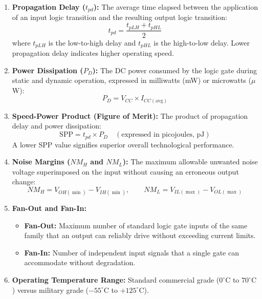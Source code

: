 \documentclass[11pt,a4paper,oneside]{book}
\begin{document}
\begin{enumerate}[leftmargin=*]
  \item \textbf{Propagation Delay ($t_{pd}$):} The average time elapsed between the application of an input logic transition and the resulting output logic transition:
  \[
  t_{pd} = \frac{t_{pLH} + t_{pHL}}{2}
  \]
  where $t_{pLH}$ is the low-to-high delay and $t_{pHL}$ is the high-to-low delay. Lower propagation delay indicates higher operating speed.

  \item \textbf{Power Dissipation ($P_D$):} The DC power consumed by the logic gate during static and dynamic operation, expressed in milliwatts (mW) or microwatts ($\mu$W):
  \[
  P_D = V_{CC} \times I_{CC(\text{avg})}
  \]

  \item \textbf{Speed-Power Product (Figure of Merit):} The product of propagation delay and power dissipation:
  \[
  \text{SPP} = t_{pd} \times P_D \quad (\text{expressed in picojoules, pJ})
  \]
  A lower SPP value signifies superior overall technological performance.

  \item \textbf{Noise Margins ($NM_H$ and $NM_L$):} The maximum allowable unwanted noise voltage superimposed on the input without causing an erroneous output change:
  \[
  NM_H = V_{OH(\min)} - V_{IH(\min)}, \qquad NM_L = V_{IL(\max)} - V_{OL(\max)}
  \]

  \item \textbf{Fan-Out and Fan-In:}
  \begin{itemize}
    \item \textbf{Fan-Out:} Maximum number of standard logic gate inputs of the same family that an output can reliably drive without exceeding current limits.
    \item \textbf{Fan-In:} Number of independent input signals that a single gate can accommodate without degradation.
  \end{itemize}

  \item \textbf{Operating Temperature Range:} Standard commercial grade ($0^\circ\text{C}$ to $70^\circ\text{C}$) versus military grade ($-55^\circ\text{C}$ to $+125^\circ\text{C}$).
\end{enumerate}
\end{document}
